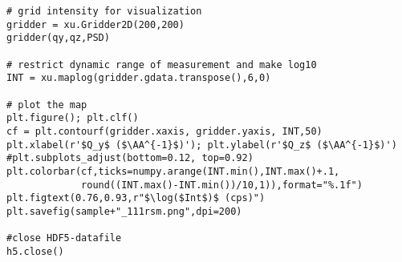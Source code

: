 \begin{lstlisting}[caption={reading a spec-file, saving it to HDF5, reading a particular scan, convert it to reciprocal space, plot it using matplotlib}]
# grid intensity for visualization
gridder = xu.Gridder2D(200,200)
gridder(qy,qz,PSD)

# restrict dynamic range of measurement and make log10
INT = xu.maplog(gridder.gdata.transpose(),6,0)

# plot the map
plt.figure(); plt.clf()
cf = plt.contourf(gridder.xaxis, gridder.yaxis, INT,50)
plt.xlabel(r'$Q_y$ ($\AA^{-1}$)'); plt.ylabel(r'$Q_z$ ($\AA^{-1}$)')
#plt.subplots_adjust(bottom=0.12, top=0.92)
plt.colorbar(cf,ticks=numpy.arange(INT.min(),INT.max()+.1,
             round((INT.max()-INT.min())/10,1)),format="%.1f")
plt.figtext(0.76,0.93,r"$\log($Int$)$ (cps)") 
plt.savefig(sample+"_111rsm.png",dpi=200)

#close HDF5-datafile
h5.close()
\end{lstlisting}
